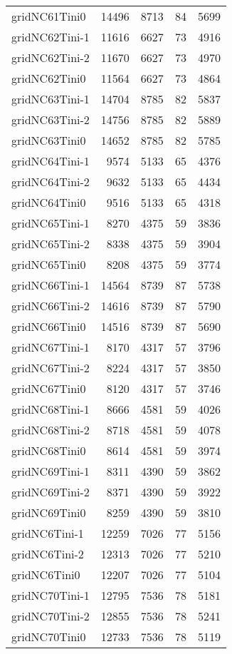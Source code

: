 \begin{longtable}{lrrrr}
gridNC61Tini0 & 14496 & 8713 & 84 & 5699 \\
gridNC62Tini-1 & 11616 & 6627 & 73 & 4916 \\
gridNC62Tini-2 & 11670 & 6627 & 73 & 4970 \\
gridNC62Tini0 & 11564 & 6627 & 73 & 4864 \\
gridNC63Tini-1 & 14704 & 8785 & 82 & 5837 \\
gridNC63Tini-2 & 14756 & 8785 & 82 & 5889 \\
gridNC63Tini0 & 14652 & 8785 & 82 & 5785 \\
gridNC64Tini-1 & 9574 & 5133 & 65 & 4376 \\
gridNC64Tini-2 & 9632 & 5133 & 65 & 4434 \\
gridNC64Tini0 & 9516 & 5133 & 65 & 4318 \\
gridNC65Tini-1 & 8270 & 4375 & 59 & 3836 \\
gridNC65Tini-2 & 8338 & 4375 & 59 & 3904 \\
gridNC65Tini0 & 8208 & 4375 & 59 & 3774 \\
gridNC66Tini-1 & 14564 & 8739 & 87 & 5738 \\
gridNC66Tini-2 & 14616 & 8739 & 87 & 5790 \\
gridNC66Tini0 & 14516 & 8739 & 87 & 5690 \\
gridNC67Tini-1 & 8170 & 4317 & 57 & 3796 \\
gridNC67Tini-2 & 8224 & 4317 & 57 & 3850 \\
gridNC67Tini0 & 8120 & 4317 & 57 & 3746 \\
gridNC68Tini-1 & 8666 & 4581 & 59 & 4026 \\
gridNC68Tini-2 & 8718 & 4581 & 59 & 4078 \\
gridNC68Tini0 & 8614 & 4581 & 59 & 3974 \\
gridNC69Tini-1 & 8311 & 4390 & 59 & 3862 \\
gridNC69Tini-2 & 8371 & 4390 & 59 & 3922 \\
gridNC69Tini0 & 8259 & 4390 & 59 & 3810 \\
gridNC6Tini-1 & 12259 & 7026 & 77 & 5156 \\
gridNC6Tini-2 & 12313 & 7026 & 77 & 5210 \\
gridNC6Tini0 & 12207 & 7026 & 77 & 5104 \\
gridNC70Tini-1 & 12795 & 7536 & 78 & 5181 \\
gridNC70Tini-2 & 12855 & 7536 & 78 & 5241 \\
gridNC70Tini0 & 12733 & 7536 & 78 & 5119 \\

\end{longtable}
